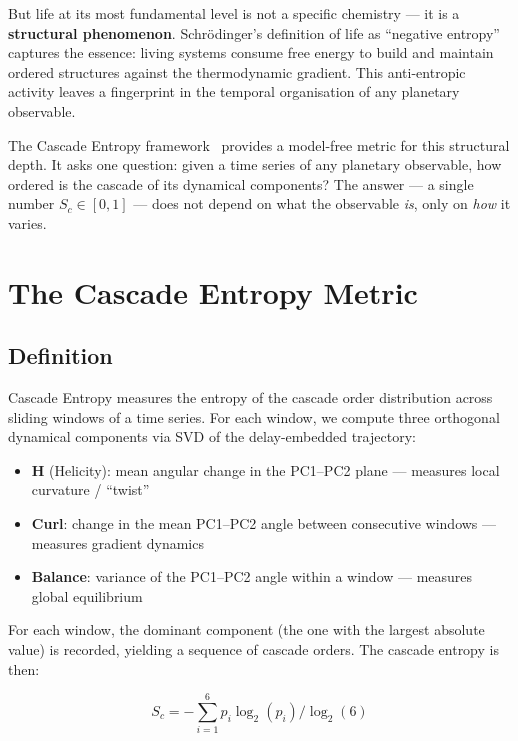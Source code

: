 \documentclass[12pt,a4paper]{article}
\begin{document}
But life at its most fundamental level is not a specific chemistry --- it is
a \textbf{structural phenomenon}. Schr\"{o}dinger's definition of life as
``negative entropy''~\cite{schrodinger1944} captures the essence: living
systems consume free energy to build and maintain ordered structures against
the thermodynamic gradient. This anti-entropic activity leaves a fingerprint
in the temporal organisation of any planetary observable.

The Cascade Entropy framework~\cite{cascade_entropy_v5} provides a
model-free metric for this structural depth. It asks one question: given a
time series of any planetary observable, how ordered is the cascade of its
dynamical components? The answer --- a single number $S_c \in [0,1]$ ---
does not depend on what the observable \emph{is}, only on \emph{how} it
varies.

\section{The Cascade Entropy Metric}

\subsection{Definition}

Cascade Entropy measures the entropy of the cascade order distribution
across sliding windows of a time series. For each window, we compute three
orthogonal dynamical components via SVD of the delay-embedded trajectory:

\begin{itemize}[leftmargin=*]
  \item \textbf{H} (Helicity): mean angular change in the PC1--PC2 plane
    --- measures local curvature / ``twist''
  \item \textbf{Curl}: change in the mean PC1--PC2 angle between
    consecutive windows --- measures gradient dynamics
  \item \textbf{Balance}: variance of the PC1--PC2 angle within a window
    --- measures global equilibrium
\end{itemize}

For each window, the dominant component (the one with the largest absolute
value) is recorded, yielding a sequence of cascade orders. The cascade
entropy is then:

\begin{equation}
  S_c = -\sum_{i=1}^{6} p_i \log_2(p_i) / \log_2(6)
  \label{eq:sc}
\end{equation}
\end{document}
